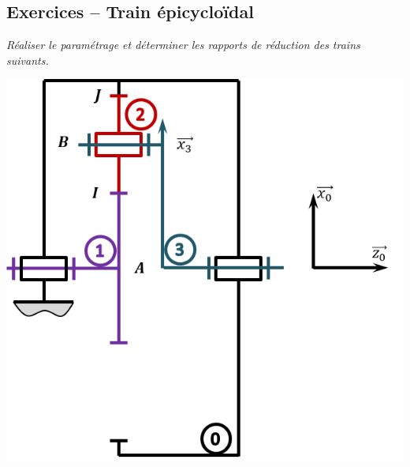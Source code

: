 \documentclass[10pt,fleqn]{article} %
\begin{document}
\def\pathfig{images}

\vspace{4.5cm}
\pagestyle{fancy}
\thispagestyle{plain}

\def\columnseprulecolor{\color{ocre}}
\setlength{\columnseprule}{0.4pt} 

\def\pathfig{images}

\ifprof
\else
\begin{multicols}{2}
\fi


\section*{Exercices -- Train épicycloïdal}
\setcounter{subparagraph}{0}
\textit{Réaliser le paramétrage et déterminer les rapports de réduction des trains suivants.}

\begin{center}
\includegraphics[width=\linewidth]{images/train_01}
\end{center}

\vspace{1cm}


\end{multicols}
\end{document}
